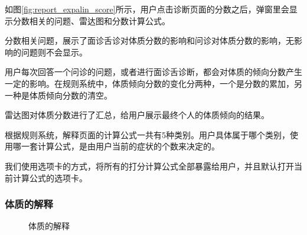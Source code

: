 如图\ref{fig:report_expalin_score}所示，用户点击诊断页面的分数之后，弹窗里会显示分数相关的问题、雷达图和分数计算公式。

分数相关问题，展示了面诊舌诊对体质分数的影响和问诊对体质分数的影响，无影响的问题则不会显示。

用户每次回答一个问诊的问题，或者进行面诊舌诊断，都会对体质的倾向分数产生一定的影响。在规则系统中，体质倾向分数的变化分两种，一个是分数的累加，另一种是体质倾向分数的清空。

雷达图对体质分数进行了汇总，给用户展示最终个人的体质倾向的结果。

根据规则系统，解释页面的计算公式一共有5种类别。用户具体属于哪个类别，使用哪一套计算公式，是由用户当前的症状的个数来决定的。

我们使用选项卡的方式，将所有的打分计算公式全部暴露给用户，并且默认打开当前计算公式的选项卡。

\subsubsection{体质的解释}

\begin{figure}[htbp]
    \centering
    \caption{体质的解释}
    \label{fig:report_explain_phy_1}
\end{figure}

